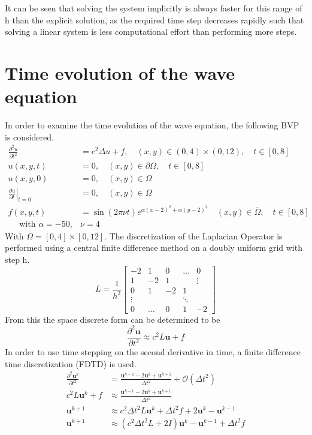\documentclass{article}
\begin{document}
It can be seen that solving the system implicitly is always faster for this range of h than the explicit solution, as the required time step decreases rapidly such that solving a linear system is less computational effort than performing more steps.

\section{Time evolution of the wave equation}
In order to examine the time evolution of the wave equation, the following BVP is considered.
\begin{equation}
\begin{aligned} \frac{\partial^{2} u}{\partial t^{2}} &=c^{2} \Delta u+f, \quad(x, y) \in(0,4) \times(0,12), \quad t \in[0,8] \\ u(x, y, t) &=0, \quad(x, y) \in \partial \Omega, \quad t \in[0,8] \\ u(x, y, 0) &=0, \quad(x, y) \in \Omega \\\left.\frac{\partial u}{\partial t}\right|_{t=0} &=0, \quad(x, y) \in \Omega \\ f(x, y, t) &=\sin (2 \pi \nu t) e^{\alpha(x-2)^{2}+\alpha(y-2)^{2}} \quad(x, y) \in \overline{\Omega}, \quad t \in[0,8] \\ \quad \text { with } \alpha=-50, & \nu=4 \end{aligned}
\end{equation}
With $\overline{\Omega} = \left[0,4\right]\times \left[0,12\right]$. 
The discretization of the Laplacian Operator is performed using a central finite difference method on a doubly uniform grid with step h.
\begin{equation}
L=\frac{1}{h^2}
\begin{bmatrix}
-2&1&0&\dots&0\\
1&-2&1& &\vdots\\
0&1&-2&1&\\
\vdots&&&\ddots&\\
0&\dots&0&1&-2
\end{bmatrix}
\label{eq:Laplacian}
\end{equation}
From this the space discrete form can be determined to be
\begin{equation}
\frac{\partial^2 \mathbf{u}}{\partial t^2} \approx c^2 L \mathbf{u} + f
\end{equation}
In order to use time stepping on the second derivative in time, a finite difference time discretization (FDTD) is used.
\begin{align}
\frac{\partial^2 \mathbf{u}^k}{\partial t^2} &= \frac{\mathbf{u}^{k-1}-2\mathbf{u}^{k}+\mathbf{u}^{k+1}}{\Delta t ^2}+\mathcal{O}(\Delta t^2)\\
 c^2 L \mathbf{u}^k +f &\approx \frac{\mathbf{u}^{k-1}-2\mathbf{u}^{k}+\mathbf{u}^{k+1}}{\Delta t ^2}\\
\mathbf{u}^{k+1} &\approx c^2 \Delta t ^2 L \mathbf{u}^k +\Delta t ^2 f + 2\mathbf{u}^{k} - \mathbf{u}^{k-1}\\
\mathbf{u}^{k+1} &\approx (c^2 \Delta t ^2 L+ 2I)\mathbf{u}^{k} - \mathbf{u}^{k-1} +\Delta t ^2 f
\end{align}
\end{document}

